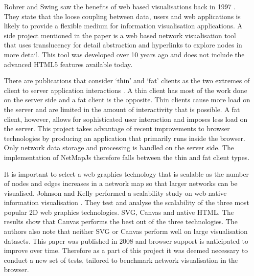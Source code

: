 \documentclass[11pt, a4paper]{article}
\begin{document}
Rohrer and Swing saw the benefits of web based visualisations back in 1997
\cite{Rohrer_1997}. They state that the loose coupling between data, users and
web applications is likely to provide a flexible medium for information
visualisation applications.  A side project mentioned in the paper is a web
based network visualisation tool that uses translucency for detail abstraction
and hyperlinks to explore nodes in more detail. This tool was developed over 10
years ago and does not include the advanced HTML5 features available today.

  
There are publications that consider `thin' and `fat' clients as the two
extremes of client to server application interactions
\cite{Eick_2007}\cite{Jern_1998}. A thin client has most of the work done on the
server side and a fat client is the opposite. Thin clients cause more load on
the server and are limited in the amount of interactivity that is possible. A
fat client, however, allows for sophisticated user interaction and imposes less
load on the server. This project takes advantage of recent improvements to
browser technologies by producing an application that primarily runs inside the
browser. Only network data storage and processing is handled on the server side.
The implementation of NetMapJs therefore falls between the thin and fat client
types.

It is important to select a web graphics technology that is scalable as the
number of nodes and edges increases in a network map so that larger networks can
be visualised. Johnson and Kelly performed a scalability study on web-native
information visualisation \cite{Johnson_2008}.  They test and analyse the
scalability of the three most popular 2D web graphics technologies.  SVG, Canvas
and native HTML. The results show that Canvas performs the best out of the three
technologies. The authors also note that neither SVG or Canvas perform well on
large visualisation datasets. This paper was published in 2008 and browser
support is anticipated to improve over time. Therefore as a part of this project
it was deemed necessary to conduct a new set of tests, tailored to benchmark
network visualisation in the browser.
\end{document}
